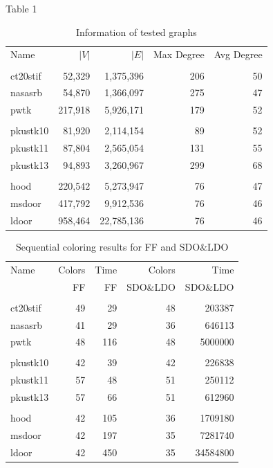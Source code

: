 \documentclass[preprint]{sigplanconf}
\begin{document}
Table 1

\begin{table}
\scriptsize
\begin{center}
\begin{tabular}{l r r r r}
\hline
Name & $|V|$ & $|E|$ & Max Degree & Avg Degree \\
\\
\hline
ct20stif & 52,329 & 1,375,396 & 206 & 50 \\
nasasrb & 54,870 & 1,366,097 & 275 & 47 \\
pwtk  & 217,918 & 5,926,171 & 179 & 52 \\
\\
pkustk10 & 81,920 & 2,114,154 & 89 & 52 \\
pkustk11 & 87,804 & 2,565,054 & 131 & 55 \\
pkustk13 & 94,893 & 3,260,967 & 299 & 68\\
\\
hood & 220,542 & 5,273,947 & 76  & 47 \\
msdoor & 417,792 & 9,912,536 & 76 & 46 \\
ldoor & 958,464 & 22,785,136 & 76 & 46 \\

\end{tabular}
\caption{Information of tested graphs}
\label{amean_time}
\end{center}
\end{table}


\begin{table}
\scriptsize
\begin{center}
\begin{tabular}{l r r r r}
\hline
Name & Colors  & Time  & Colors & Time \\
 & FF & FF &   SDO$\&$LDO &  SDO$\&$LDO\\
\\
\hline
ct20stif & 49 & 29 & 48 & 203387 \\
nasasrb & 41 & 29 & 36 & 646113 \\
pwtk  & 48 & 116 & 48 & 5000000 \\
\\
pkustk10 & 42 & 39 & 42 & 226838 \\
pkustk11 & 57 & 48 & 51 & 250112 \\
pkustk13 & 57 & 66 & 51 & 612960\\
\\
hood & 42 & 105 & 36  & 1709180 \\
msdoor & 42 & 197 & 35 & 7281740 \\
ldoor & 42 & 450 & 35 & 34584800 \\

\end{tabular}
\caption{Sequential coloring results for FF and SDO$\&$LDO}
\label{amean_time}
\end{center}
\end{table}
\end{document}
